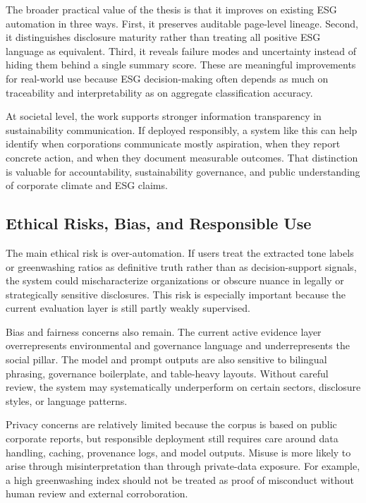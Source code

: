 \documentclass[english, online, cse, master]{dithesis}
\begin{document}
The broader practical value of the thesis is that it improves on existing ESG automation in three ways. First, it preserves auditable page-level lineage. Second, it distinguishes disclosure maturity rather than treating all positive ESG language as equivalent. Third, it reveals failure modes and uncertainty instead of hiding them behind a single summary score. These are meaningful improvements for real-world use because ESG decision-making often depends as much on traceability and interpretability as on aggregate classification accuracy.

At societal level, the work supports stronger information transparency in sustainability communication. If deployed responsibly, a system like this can help identify when corporations communicate mostly aspiration, when they report concrete action, and when they document measurable outcomes. That distinction is valuable for accountability, sustainability governance, and public understanding of corporate climate and ESG claims.

\subsection{Ethical Risks, Bias, and Responsible Use}

The main ethical risk is over-automation. If users treat the extracted tone labels or greenwashing ratios as definitive truth rather than as decision-support signals, the system could mischaracterize organizations or obscure nuance in legally or strategically sensitive disclosures. This risk is especially important because the current evaluation layer is still partly weakly supervised.

Bias and fairness concerns also remain. The current active evidence layer overrepresents environmental and governance language and underrepresents the social pillar. The model and prompt outputs are also sensitive to bilingual phrasing, governance boilerplate, and table-heavy layouts. Without careful review, the system may systematically underperform on certain sectors, disclosure styles, or language patterns.

Privacy concerns are relatively limited because the corpus is based on public corporate reports, but responsible deployment still requires care around data handling, caching, provenance logs, and model outputs. Misuse is more likely to arise through misinterpretation than through private-data exposure. For example, a high greenwashing index should not be treated as proof of misconduct without human review and external corroboration.
\end{document}
